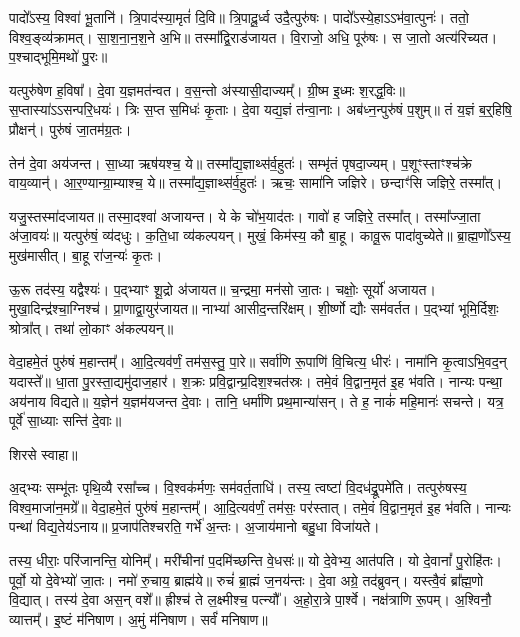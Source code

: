 पादो᳚ऽस्य॒ विश्वा॑ भू॒तानि॑। त्रि॒पाद॑स्या॒मृतं॑ दि॒वि॥ त्रि॒पादू॒र्ध्व उदै॒त्पुरु॑षः। पादो᳚ऽस्ये॒हाऽऽभ॑वा॒त्पुनः॑। ततो॒ विश्व॒ङ्व्य॑क्रामत्। सा॒श॒ना॒न॒श॒ने अ॒भि॥ तस्मा᳚द्वि॒राड॑जायत। वि॒राजो॒ अधि॒ पूरु॑षः। स जा॒तो अत्य॑रिच्यत। प॒श्चाद्भूमि॒मथो॑ पु॒रः॥

यत्पुरु॑षेण ह॒विषा᳚। दे॒वा य॒ज्ञमत॑न्वत। व॒स॒न्तो अ॑स्यासी॒दाज्यम्᳚। ग्री॒ष्म इ॒ध्मः श॒रद्ध॒विः॥ स॒प्तास्या॑ऽऽ\-सन्परि॒धयः॑। त्रिः स॒प्त स॒मिधः॑ कृ॒ताः। दे॒वा यद्य॒ज्ञं त॑न्वा॒नाः। अब॑ध्न॒न्पुरु॑षं प॒शुम्॥ तं य॒ज्ञं ब॒र्॒‌हिषि॒ प्रौक्षन्॑। पुरु॑षं जा॒तम॑ग्र॒तः।

तेन॑ दे॒वा अय॑जन्त। सा॒ध्या ऋष॑यश्च॒ ये॥ तस्मा᳚द्य॒ज्ञाथ्स॑र्व॒\-हुतः॑। सम्भृ॑तं पृषदा॒ज्यम्। प॒शूꣳस्ताꣳश्च॑क्रे वाय॒व्यान्॑। आ॒र॒ण्यान्ग्रा॒म्याश्च॒ ये॥ तस्मा᳚द्य॒ज्ञाथ्स॑र्व॒हुतः॑। ऋचः॒ सामा॑नि जज्ञिरे। छन्दाꣳ॑सि जज्ञिरे॒ तस्मा᳚त्।

यजु॒स्तस्मा॑दजायत॥ तस्मा॒दश्वा॑ अजायन्त। ये के चो॑भ॒याद॑तः। गावो॑ ह जज्ञिरे॒ तस्मा᳚त्। तस्मा᳚ज्जा॒ता अ॑जा॒वयः॑॥ यत्पुरु॑षं॒ व्य॑दधुः। क॒ति॒धा व्य॑कल्पयन्। मुखं॒ किम॑स्य॒ कौ बा॒हू। कावू॒रू पादा॑वुच्येते॥ ब्रा॒ह्म॒णो᳚ऽस्य॒ मुख॑मासीत्। बा॒हू रा॑ज॒न्यः॑ कृ॒तः।

ऊ॒रू तद॑स्य॒ यद्वैश्यः॑। प॒द्भ्याꣳ शू॒द्रो अ॑जायत॥ च॒न्द्रमा॒ मन॑सो जा॒तः। चक्षोः॒ सूर्यो॑ अजायत। मुखा॒दिन्द्र॑श्चा॒ग्निश्च॑। प्रा॒णाद्वा॒युर॑जायत॥ नाभ्या॑ आसीद॒न्तरि॑क्षम्। शी॒र्ष्णो द्यौः सम॑वर्तत। प॒द्भ्यां भूमि॒र्दिशः॒ श्रोत्रा᳚त्। तथा॑ लो॒काꣳ अ॑कल्पयन्॥

वेदा॒हमे॒तं पुरु॑षं म॒हान्तम्᳚। आ॒दि॒त्यव॑र्णं॒ तम॑स॒स्तु॒ पा॒रे॥ सर्वा॑णि रू॒पाणि॑ वि॒चित्य॒ धीरः॑। नामा॑नि कृ॒त्वाऽभि॒वद॒न् यदास्ते᳚॥ धा॒ता पु॒रस्ता॒द्यमु॑दाज॒हार॑। श॒क्रः प्रवि॒द्वान्प्र॒दिश॒श्चत॑स्रः। तमे॒वं वि॒द्वान॒मृत॑ इ॒ह भ॑वति। नान्यः पन्था॒ अय॑नाय विद्यते॥ य॒ज्ञेन॑ य॒ज्ञम॑यजन्त दे॒वाः। तानि॒ धर्मा॑णि प्रथ॒मान्या॑सन्। ते ह॒ नाकं॑ महि॒मानः॑ सचन्ते। यत्र॒ पूर्वे॑ सा॒ध्याः सन्ति॑ दे॒वाः॥

शिरसे स्वाहा॥

{\small\closesection}


अ॒द्भ्यः सम्भू॑तः पृथि॒व्यै रसा᳚च्च। वि॒श्वक॑र्मणः॒ सम॑वर्त॒ताधि॑। तस्य॒ त्वष्टा॑ वि॒दध॑द्रू॒पमे॑ति। तत्पुरु॑षस्य॒ विश्व॒माजा॑न॒मग्रे᳚॥ वेदा॒हमे॒तं पुरु॑षं म॒हान्तम्᳚। आ॒दि॒त्यव॑र्णं॒ तम॑सः॒ पर॑स्तात्। तमे॒वं वि॒द्वान॒मृत॑ इ॒ह भ॑वति। नान्यः पन्था॑ विद्य॒तेय॑ऽनाय॥ प्र॒जाप॑तिश्चरति॒ गर्भे॑ अ॒न्तः। अ॒जाय॑मानो बहु॒धा विजा॑यते।

तस्य॒ धीराः॒ परि॑जानन्ति॒ योनिम्᳚। मरी॑चीनां प॒दमि॑च्छन्ति वे॒धसः॑॥ यो दे॒वेभ्य॒ आत॑पति। यो दे॒वानां᳚ पु॒रोहि॑तः। पूर्वो॒ यो दे॒वेभ्यो॑ जा॒तः। नमो॑ रु॒चाय॒ ब्राह्म॑ये॥ रुचं॑ ब्रा॒ह्मं ज॒नय॑न्तः। दे॒वा अग्रे॒ तद॑ब्रुवन्। यस्त्वै॒वं ब्रा᳚ह्म॒णो वि॒द्यात्। तस्य॑ दे॒वा अस॒न् वशे᳚॥ ह्रीश्च॑ ते ल॒क्ष्मीश्च॒ पत्न्यौ᳚। अ॒हो॒रा॒त्रे पा॒र्श्वे। नक्ष॑त्राणि रू॒पम्। अ॒श्विनौ॒ व्यात्तम्᳚। इ॒ष्टं म॑निषाण। अ॒मुं म॑निषाण। सर्वं॑ मनिषाण॥

